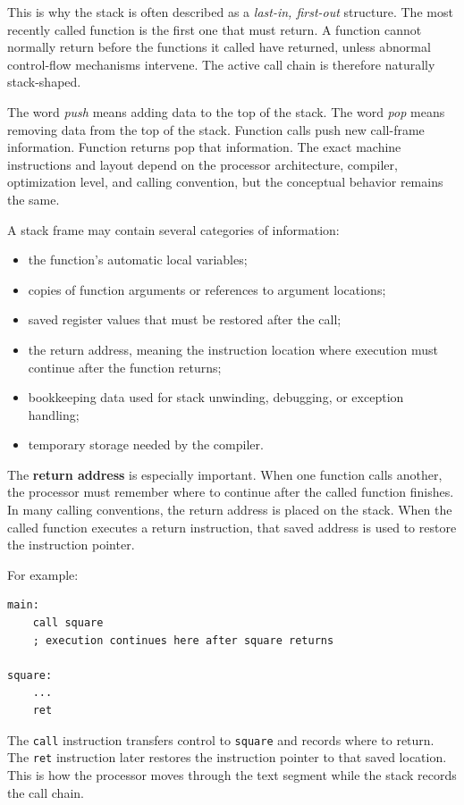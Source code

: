 This is why the stack is often described as a \emph{last-in, first-out} structure. The most recently called function is the first one that must return. A function cannot normally return before the functions it called have returned, unless abnormal control-flow mechanisms intervene. The active call chain is therefore naturally stack-shaped.

The word \emph{push} means adding data to the top of the stack. The word \emph{pop} means removing data from the top of the stack. Function calls push new call-frame information. Function returns pop that information. The exact machine instructions and layout depend on the processor architecture, compiler, optimization level, and calling convention, but the conceptual behavior remains the same.

A stack frame may contain several categories of information:

\begin{itemize}
    \item the function's automatic local variables;
    \item copies of function arguments or references to argument locations;
    \item saved register values that must be restored after the call;
    \item the return address, meaning the instruction location where execution must continue after the function returns;
    \item bookkeeping data used for stack unwinding, debugging, or exception handling;
    \item temporary storage needed by the compiler.
\end{itemize}

The \textbf{return address} is especially important. When one function calls another, the processor must remember where to continue after the called function finishes. In many calling conventions, the return address is placed on the stack. When the called function executes a return instruction, that saved address is used to restore the instruction pointer.

For example:

\begin{verbatim}
main:
    call square
    ; execution continues here after square returns

square:
    ...
    ret
\end{verbatim}

The \texttt{call} instruction transfers control to \texttt{square} and records where to return. The \texttt{ret} instruction later restores the instruction pointer to that saved location. This is how the processor moves through the text segment while the stack records the call chain.

